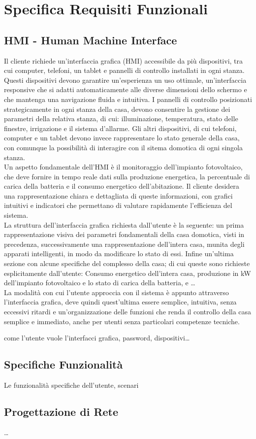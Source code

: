 \documentclass[italian, 12pt, a4paper]{article}
\begin{document}
\section{Specifica Requisiti Funzionali}\label{sec:requisiti2}
\subsection{HMI - Human Machine Interface}
Il cliente richiede un’interfaccia grafica (HMI) accessibile da più dispositivi, tra cui computer, telefoni, un tablet e pannelli di controllo installati in ogni stanza. Questi dispositivi devono garantire un'esperienza un uso ottimale, un'interfaccia responsive che si adatti automaticamente alle diverse dimensioni dello schermo e che mantenga una navigazione fluida e intuitiva.  I pannelli di controllo posizionati strategicamente in ogni stanza della casa, devono consentire la gestione dei parametri della relativa stanza, di cui: illuminazione, temperatura, stato delle finestre, irrigazione e il sistema d’allarme. Gli altri dispositivi, di cui telefoni, computer e un tablet devono invece rappresentare lo stato generale della casa, con comunque la possibilità di interagire con il sitema domotica di ogni singola stanza.\\[1.5mm]
Un aspetto fondamentale dell’HMI è il monitoraggio dell’impianto fotovoltaico, che deve fornire in tempo reale dati sulla produzione energetica, la percentuale di carica della batteria e il consumo energetico dell’abitazione. Il cliente desidera una rappresentazione chiara e dettagliata di queste informazioni, con grafici intuitivi e indicatori che permettano di valutare rapidamente l’efficienza del sistema.\\[1.5mm]
La struttura dell’interfaccia grafica richiesta dall’utente è la seguente: un prima rappresentazione visiva dei parametri fondamentali della casa domotica, visti in precedenza, successivamente una rappresentazione dell’intera casa, munita degli apparati intelligenti, in modo da modificare lo stato di essi. Infine un’ultima sezione con alcune specifiche del complesso della casa; di cui queste sono richieste esplicitamente dall’utente: Consumo energetico dell’intera casa, produzione in kW dell’impianto fotovoltaico e lo stato di carica della batteria, e \ldots\\[1.5mm]
La modalità con cui l’utente approccia con il sistema è appunto attraverso l’interfaccia grafica, deve quindi quest’ultima essere semplice, intuitiva, senza eccessivi ritardi e un’organizzazione delle funzioni che renda il controllo della casa semplice e immediato, anche per utenti senza particolari competenze tecniche.

come l'utente vuole l'interfacci grafica, password, dispositivi\ldots
\subsection{Specifiche Funzionalità}
Le funzionalità specifiche dell'utente, scenari
\subsection{Progettazione di Rete}
\ldots
\clearpage
\end{document}
